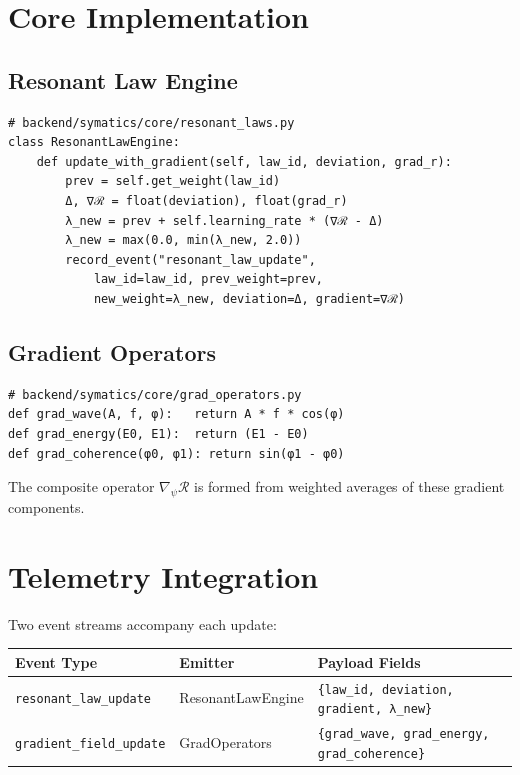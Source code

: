 \documentclass[11pt]{article}
\begin{document}
\section{Core Implementation}
\subsection*{Resonant Law Engine}
\begin{verbatim}
# backend/symatics/core/resonant_laws.py
class ResonantLawEngine:
    def update_with_gradient(self, law_id, deviation, grad_r):
        prev = self.get_weight(law_id)
        Δ, ∇ℛ = float(deviation), float(grad_r)
        λ_new = prev + self.learning_rate * (∇ℛ - Δ)
        λ_new = max(0.0, min(λ_new, 2.0))
        record_event("resonant_law_update",
            law_id=law_id, prev_weight=prev,
            new_weight=λ_new, deviation=Δ, gradient=∇ℛ)
\end{verbatim}

\subsection*{Gradient Operators}
\begin{verbatim}
# backend/symatics/core/grad_operators.py
def grad_wave(A, f, φ):   return A * f * cos(φ)
def grad_energy(E0, E1):  return (E1 - E0)
def grad_coherence(φ0, φ1): return sin(φ1 - φ0)
\end{verbatim}

The composite operator \(\nabla_\psi\mathcal{R}\)
is formed from weighted averages of these gradient components.

\section{Telemetry Integration}
Two event streams accompany each update:

\begin{center}
\begin{tabular}{lll}
\toprule
\textbf{Event Type} & \textbf{Emitter} & \textbf{Payload Fields}\\
\midrule
\texttt{resonant\_law\_update} & ResonantLawEngine &
\texttt{\{law\_id, deviation, gradient, λ\_new\}}\\
\texttt{gradient\_field\_update} & GradOperators &
\texttt{\{grad\_wave, grad\_energy, grad\_coherence\}}\\
\bottomrule
\end{tabular}
\end{center}
\end{document}

